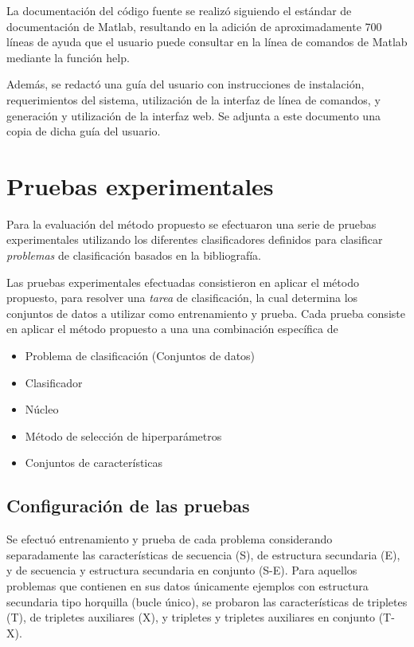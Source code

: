 \documentclass[12pt,bibliography=oldstyle,DIV=12,parskip=half-]{scrreprt}
\newcommand{\e}{\emph}
\begin{document}
La documentación del código fuente se realizó siguiendo el estándar de
documentación de Matlab, resultando en la adición de aproximadamente
700 líneas de ayuda que el usuario puede consultar en la línea de
comandos de Matlab mediante la función {\mono help}.

Además, se redactó una guía del usuario con instrucciones de
instalación, requerimientos del sistema, utilización de la interfaz de
línea de comandos, y generación y utilización de la interfaz web.  Se
adjunta a este documento una copia de dicha guía del usuario.
%
%
%
\section{Pruebas experimentales}
%
\newcommand{\Gm}{\scriptsize $G_m$}
\newcommand{\SE}{\scriptsize $SE$}
\newcommand{\SP}{\scriptsize $SP$}
\newcommand{\Ft}[1]{\mrow{2}{*}{#1}}
\newcommand{\tbmean}{\footnotesize $E$}
\newcommand{\tbstd}{\small $\sigma$}
%
Para la evaluación del método propuesto se efectuaron una serie de
pruebas experimentales utilizando los diferentes clasificadores
definidos para clasificar \emph{problemas} de clasificación basados en
la bibliografía.

Las pruebas experimentales efectuadas consistieron en aplicar el
método propuesto, para resolver una \e{tarea} de clasificación, la
cual determina los conjuntos de datos a utilizar como entrenamiento y
prueba.  Cada prueba consiste en aplicar el método propuesto a una una
combinación específica de
%
\begin{itemize}
\item Problema de clasificación (Conjuntos de datos)
\item Clasificador
\item Núcleo
\item Método de selección de hiperparámetros
\item Conjuntos de características
\end{itemize}
%

%
%
\subsection{Configuración de las pruebas}
%
Se efectuó entrenamiento y prueba de cada problema considerando
separadamente las características de secuencia (S), de estructura
secundaria (E), y de secuencia y estructura secundaria en conjunto
(S-E).  Para aquellos problemas que contienen en sus datos únicamente
ejemplos con estructura secundaria tipo horquilla (bucle único), se
probaron las características de tripletes (T), de tripletes auxiliares
(X), y tripletes y tripletes auxiliares en conjunto (T-X).
\end{document}
